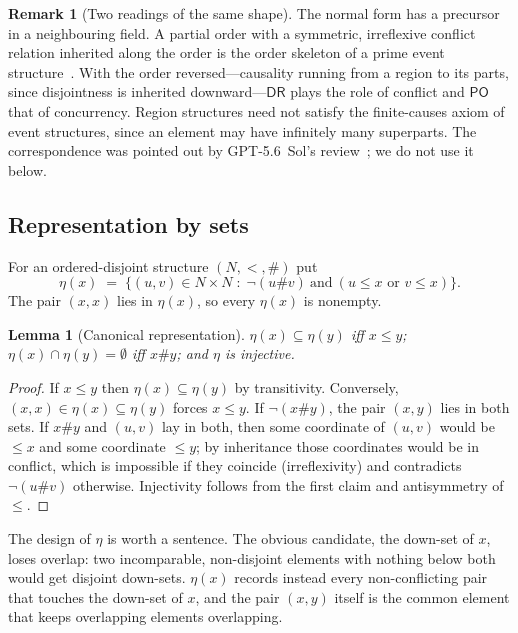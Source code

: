 \documentclass[11pt]{article}
\newcommand{\DR}{\mathsf{DR}}
\newcommand{\PO}{\mathsf{PO}}
\theoremstyle{plain}
\newtheorem{lemma}[theorem]{Lemma}
\theoremstyle{definition}
\newtheorem{remark}[theorem]{Remark}
\begin{document}
\begin{remark}[Two readings of the same shape]
The normal form has a precursor in a neighbouring field. A partial order with a
symmetric, irreflexive conflict relation inherited along the order is the
order skeleton of a prime event structure~\cite{NielsenPlotkinWinskel1981}. With
the order reversed---causality running from a region to its parts, since
disjointness is inherited downward---$\DR$ plays the role of conflict and $\PO$
that of concurrency. Region structures need not satisfy the finite-causes axiom
of event structures, since an element may have infinitely many superparts. The
correspondence was pointed out by GPT-5.6~Sol's review~\cite{GPT56SolReview};
we do not use it below.
\end{remark}

\subsection{Representation by sets}
\label{ssec:sets}

For an ordered-disjoint structure $(N,<,\#)$ put
\[
  \eta(x) \;=\; \{(u,v)\in N\times N \;:\; \neg(u\#v)\ \text{and}\ (u\le x \text{ or } v\le x)\}.
\]
The pair $(x,x)$ lies in $\eta(x)$, so every $\eta(x)$ is nonempty.

\begin{lemma}[Canonical representation]\label{lem:eta}
$\eta(x)\subseteq\eta(y)$ iff $x\le y$; $\eta(x)\cap\eta(y)=\emptyset$ iff $x\#y$;
and $\eta$ is injective.
\end{lemma}

\begin{proof}
If $x\le y$ then $\eta(x)\subseteq\eta(y)$ by transitivity. Conversely,
$(x,x)\in\eta(x)\subseteq\eta(y)$ forces $x\le y$. If $\neg(x\#y)$, the pair
$(x,y)$ lies in both sets. If $x\#y$ and $(u,v)$ lay in both, then some
coordinate of $(u,v)$ would be $\le x$ and some coordinate $\le y$; by
inheritance those coordinates would be in conflict, which is impossible if they
coincide (irreflexivity) and contradicts $\neg(u\#v)$ otherwise. Injectivity
follows from the first claim and antisymmetry of $\le$.
\end{proof}

The design of $\eta$ is worth a sentence. The obvious candidate, the down-set of
$x$, loses overlap: two incomparable, non-disjoint elements with nothing below
both would get disjoint down-sets. $\eta(x)$ records instead every non-conflicting
pair that touches the down-set of $x$, and the pair $(x,y)$ itself is the common
element that keeps overlapping elements overlapping.
\end{document}
